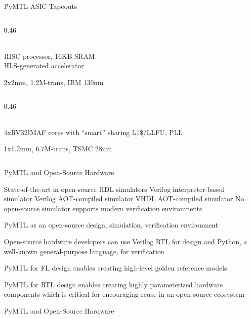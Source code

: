 \begin{frame}{PyMTL ASIC Tapeouts}
\begin{cbxcols}

  \begin{column}{0.46\tw}

    \small\centering

    \smallskip {} \\ RISC processor, 16KB SRAM \\
    HLS-generated accelerator

    \smallskip
    2x2mm, 1.2M-trans, IBM 130nm
  \end{column}

  \begin{column}{0.46\tw}

    \small\centering

    \smallskip {} \\ 4xRV32IMAF cores with ``smart'' sharing
    L1\$/LLFU, PLL

    \smallskip
    1x1.2mm, 6.7M-trans, TSMC 28nm

  \end{column}

\end{cbxcols}
\end{frame}

\begin{frame}{PyMTL and Open-Source Hardware}
\begin{cbxlist}

 \1 State-of-the-art in open-source HDL simulators
    \2  Verilog interpreter-based simulator
    \2  Verilog AOT-compiled simulator
    \2  VHDL AOT-compiled simulator
    \2 No open-source simulator supports modern verification environments

 \1 PyMTL as an open-source design, simulation, verification environment

    \2 Open-source hardware developers can use Verilog RTL for design and
       Python, a well-known general-purpose language, for verification

    \smallskip
    \2 PyMTL for FL design enables creating high-level golden reference
       models

    \smallskip
    \2 PyMTL for RTL design enables creating highly parameterized
       hardware components which is critical for encouraging reuse in an
       open-source ecosystem

\end{cbxlist}
\end{frame}

\begin{frame}{PyMTL and Open-Source Hardware}
\end{frame}

